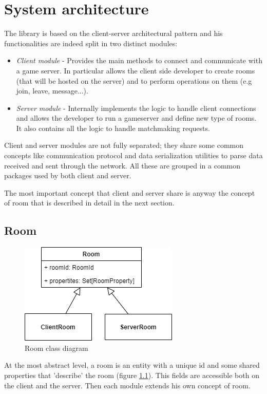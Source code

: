 \chapter{System architecture}
The library is based on the client-server architectural pattern and his functionalities are indeed split in two distinct modules: 
\begin{itemize}
	\item \textit{Client module} - Provides the main methods to connect and communicate with a game server. In particular allows the client side developer to create rooms (that will be hosted on the server) and to perform operations on them (e.g join, leave, message...).
	\item \textit{Server module} - Internally implements the logic to handle client connections and allows the developer to run a gameserver and define new type of rooms. It also contains all the logic to handle matchmaking requests.
\end{itemize}

Client and server modules are not fully separated; they share some common concepts like communication protocol and data serialization utilities to parse data received and sent through the network. All these are grouped in a common packages used by both client and server.

The most important concept that client and server share is anyway the concept of room that is described in detail in the next section. 

\section{Room}


\begin{figure}[H]
	\centering
	\includegraphics[scale=0.7]{images/3-architecture/room-class-3.png}
	\caption{Room class diagram}
	\label{fig:room_classes}
\end{figure}


At the most abstract level, a room is an entity with a unique id and some shared properties that 'describe' the room (figure \ref{fig:room_classes}). This fields are accessible both on the client and the server. Then each module extends his own concept of room.

